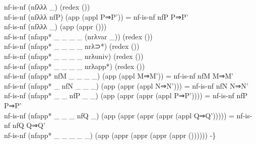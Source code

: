 {\begin{code}
{\>nf-is-nf (nfλλλ \_) (redex ())\<\\
\>nf-is-nf (nfλλλ nfP) (app (appl P⇒P')) = nf-is-nf nfP P⇒P'\<\\
\>nf-is-nf (nfλλλ \_) (app (appr ()))\<\\
\>nf-is-nf (nfapp* \_ \_ \_ \_ (nrλvar \_)) (redex ())\<\\
\>nf-is-nf (nfapp* \_ \_ \_ \_ nrλ⊃*) (redex ())\<\\
\>nf-is-nf (nfapp* \_ \_ \_ \_ nrλuniv) (redex ())\<\\
\>nf-is-nf (nfapp* \_ \_ \_ \_ nrλapp*) (redex ())\<\\
\>nf-is-nf (nfapp* nfM \_ \_ \_ \_) (app (appl M⇒M')) = nf-is-nf nfM M⇒M'\<\\
\>nf-is-nf (nfapp* \_ nfN \_ \_ \_) (app (appr (appl N⇒N'))) = nf-is-nf nfN N⇒N'\<\\
\>nf-is-nf (nfapp* \_ \_ nfP \_ \_) (app (appr (appr (appl P⇒P')))) = nf-is-nf nfP P⇒P'\<\\
\>nf-is-nf (nfapp* \_ \_ \_ nfQ \_) (app (appr (appr (appr (appl Q⇒Q'))))) = nf-is-nf nfQ Q⇒Q'\<\\
\>nf-is-nf (nfapp* \_ \_ \_ \_ \_) (app (appr (appr (appr (appr ()))))) -\}}\<%
\\
%
\\
\>  \AgdaSymbol{:}  \AgdaSymbol{\{}\AgdaSymbol{\}} \AgdaSymbol{\{}\AgdaSymbol{\}} \AgdaSymbol{\{} \AgdaSymbol{:}  \AgdaSymbol{(}  \AgdaSymbol{(} \AgdaSymbol{))\}} \AgdaSymbol{\{}  \AgdaSymbol{:}   \AgdaSymbol{\}} \AgdaSymbol{\{}\AgdaSymbol{\}}           \<%
\\
\>
\end{code}}
